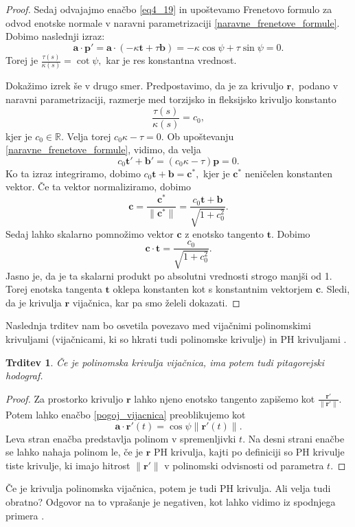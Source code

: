 \documentclass[12pt,a4paper,twoside]{article}
\theoremstyle{definition} %
\theoremstyle{plain} %
\newtheorem{trditev}[definicija]{Trditev}
\theoremstyle{primerstyle}
\numberwithin{equation}{section}  %
\newcommand{\R}{\mathbb R}
\newcommand{\tV}{\mathbf{t}}
\newcommand{\aV}{\mathbf{a}}
\newcommand{\bV}{\mathbf{b}}
\newcommand{\cV}{\mathbf{c}}
\newcommand{\pV}{\mathbf{p}}
\newcommand{\rV}{\mathbf{r}}
\begin{document}
\begin{proof}
	Sedaj odvajajmo enačbo \eqref{eq4_19} in upoštevamo Frenetovo formulo za odvod enotske normale v naravni parametrizaciji \eqref{naravne_frenetove_formule}. Dobimo naslednji izraz:
	\begin{equation*}
		\aV \cdot \pV'=\aV \cdot (-\kappa \tV+\tau \bV)=-\kappa \cos \psi + \tau \sin \psi=0.
	\end{equation*}
	Torej je $\frac{\tau(s)}{\kappa(s)}=\cot \psi,$ kar je res konstantna vrednost.
	
	Dokažimo izrek še v drugo smer. Predpostavimo, da je za krivuljo $\rV,$ podano v naravni parametrizaciji, razmerje med torzijsko in fleksijsko krivuljo konstanto
	$$\frac{\tau(s)}{\kappa(s)}=c_0,$$
	kjer je $c_0\in\R.$ Velja torej $c_0\kappa-\tau=0.$ Ob upoštevanju \eqref{naravne_frenetove_formule}, vidimo, da velja
	$$c_0\tV'+\bV'=(c_0\kappa-\tau)\pV=0.$$
	Ko ta izraz integriramo, dobimo $c_0\tV+\bV=\cV^*,$ kjer je $\cV^*$ neničelen konstanten vektor. Če ta vektor normaliziramo, dobimo
	$$\cV=\frac{\cV^*}{\lVert\cV^*\rVert}=\frac{c_0\tV+\bV}{\sqrt{1+c_0^2}}.$$
	Sedaj lahko skalarno pomnožimo vektor $\cV$ z enotsko tangento $\tV.$ Dobimo
	$$\cV\cdot\tV=\frac{c_0}{\sqrt{1+c_0^2}}.$$
	Jasno je, da je ta skalarni produkt po absolutni vrednosti strogo manjši od 1. Torej enotska tangenta $\tV$ oklepa konstanten kot s konstantnim vektorjem $\cV.$ Sledi, da je krivulja $\rV$ vijačnica, kar pa smo želeli dokazati.
\end{proof}
Naslednja trditev nam bo osvetila povezavo med vijačnimi polinomskimi krivuljami (vijačnicami, ki so hkrati tudi polinomske krivulje) in PH krivuljami \cite[str.\ 368]{faroukietal2004}.
\begin{trditev}
	\label{trditev_vijacnica_PH}
	Če je polinomska krivulja vijačnica, ima potem tudi pitagorejski hodograf.
\end{trditev}
\begin{proof}
	Za prostorko krivuljo $\rV$ lahko njeno enotsko tangento zapišemo kot $\frac{\rV'}{\lVert \rV' \rVert}.$ Potem lahko enačbo \eqref{pogoj_vijacnica} preoblikujemo kot
	\begin{equation}
		\aV \cdot \rV'(t)=\cos \psi \lVert \rV'(t) \rVert.
	\end{equation}
	Leva stran enačba predstavlja polinom v spremenljivki $t.$ Na desni strani enačbe se lahko nahaja polinom le, če je $\rV$ PH krivulja, kajti po definiciji so PH krivulje tiste krivulje, ki imajo hitrost $\lVert \rV' \rVert$ v polinomski odvisnosti od parametra $t.$
\end{proof}
Če je krivulja polinomska vijačnica, potem je tudi PH krivulja. Ali velja tudi obratno? Odgovor na to vprašanje je negativen, kot lahko vidimo iz spodnjega primera \cite[str.\ 121]{beltranmonterde}.
\end{document}
